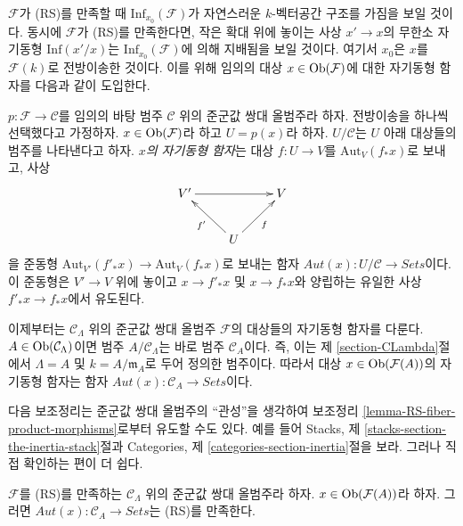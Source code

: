 \noindent
$\mathcal{F}$가 (RS)를 만족할 때 $\text{Inf}_{x_0}(\mathcal{F})$가
자연스러운 $k$-벡터공간 구조를 가짐을 보일 것이다. 동시에
$\mathcal{F}$가 (RS)를 만족한다면, 작은 확대 위에 놓이는 사상
$x' \to x$의 무한소 자기동형 $\text{Inf}(x'/x)$는
$\text{Inf}_{x_0}(\mathcal{F})$에 의해 지배됨을 보일 것이다. 여기서
$x_0$은 $x$를 $\mathcal{F}(k)$로 전방이송한 것이다. 이를 위해 임의의
대상 $x \in \mathop{\mathrm{Ob}}\nolimits(\mathcal{F})$에 대한 자기동형 함자를 다음과 같이
도입한다.

\begin{definition}
\label{definition-automorphism-functor}
$p : \mathcal{F} \to \mathcal{C}$를 임의의 바탕 범주 $\mathcal{C}$ 위의
준군값 쌍대 올범주라 하자. 전방이송을 하나씩 선택했다고 가정하자.
$x \in \mathop{\mathrm{Ob}}\nolimits(\mathcal{F})$라 하고 $U = p(x)$라 하자.
$U/\mathcal{C}$는 $U$ 아래 대상들의 범주를 나타낸다고 하자.
{\it $x$의 자기동형 함자}는 대상 $f : U \to V$를
$\text{Aut}_V(f_*x)$로 보내고, 사상
$$
\xymatrix{
V' \ar[rr] &                    & V\\
          & U \ar[ul]^{f'}  \ar[ur]_f &
}
$$
을 준동형
$\text{Aut}_{V'}(f'_*x) \to \text{Aut}_V(f_*x)$로 보내는 함자
$\mathit{Aut}(x) : U/\mathcal{C} \to \textit{Sets}$이다. 이 준동형은
$V' \to V$ 위에 놓이고 $x \to f'_*x$ 및 $x \to f_*x$와 양립하는
유일한 사상 $f'_*x \to f_*x$에서 유도된다.
\end{definition}

\noindent
이제부터는 $\mathcal{C}_\Lambda$ 위의 준군값 쌍대 올범주
$\mathcal{F}$의 대상들의 자기동형 함자를 다룬다.
$A \in \mathop{\mathrm{Ob}}\nolimits(\mathcal{C}_\Lambda)$이면 범주
$A/\mathcal{C}_\Lambda$는 바로 범주 $\mathcal{C}_A$이다. 즉, 이는
제 \ref{section-CLambda}절에서 $\Lambda = A$ 및
$k = A/\mathfrak m_A$로 두어 정의한 범주이다. 따라서 대상
$x \in \mathop{\mathrm{Ob}}\nolimits(\mathcal{F}(A))$의 자기동형 함자는 함자
$\mathit{Aut}(x) : \mathcal{C}_A \to \textit{Sets}$이다.

\medskip\noindent
다음 보조정리는 준군값 쌍대 올범주의 ``관성''을 생각하여
보조정리 \ref{lemma-RS-fiber-product-morphisms}로부터 유도할 수도 있다.
예를 들어
Stacks, 제 \ref{stacks-section-the-inertia-stack}절과
Categories, 제 \ref{categories-section-inertia}절을 보라.
그러나 직접 확인하는 편이 더 쉽다.

\begin{lemma}
\label{lemma-Aut-functor-RS}
$\mathcal{F}$를 (RS)를 만족하는 $\mathcal{C}_\Lambda$ 위의 준군값 쌍대
올범주라 하자. $x \in \mathop{\mathrm{Ob}}\nolimits(\mathcal{F}(A))$라 하자. 그러면
$\mathit{Aut}(x): \mathcal{C}_A \to \textit{Sets}$는 (RS)를 만족한다.
\end{lemma}

